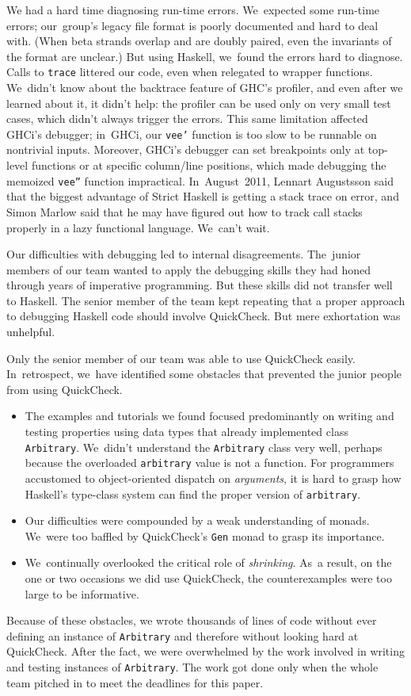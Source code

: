 \documentclass[preprint,nonatbib,blockstyle,times]{sigplanconf}
\newcommand\seclabel[1]{\label{sec:#1}}
\begin{document}
We had a hard time diagnosing run-time errors.
We~expected some run-time errors;
our~group's legacy file
format is poorly documented and hard to deal with.
(When beta
strands overlap and are doubly paired, even the invariants of the
format are unclear.)
But using Haskell, we~found the errors hard to diagnose.
Calls to
\texttt{trace} 
littered our code,
even when relegated to wrapper functions.
We~didn't know about the backtrace feature of GHC's profiler,
and even after we learned about it, it didn't help:
the profiler can be used only on very small test cases,
which didn't always trigger the errors.
This same limitation affected GHCi's debugger; 
in~GHCi, our \texttt{vee'} function
is too slow to be runnable on nontrivial
inputs.
Moreover,  GHCi's debugger can set breakpoints only at top-level functions
or at specific column/line positions, which made debugging the memoized
\texttt{vee''} function impractical.
In~August~2011, 
Lennart Augustsson said that the biggest advantage of Strict
Haskell is getting a stack trace on error,
and Simon Marlow said that he may have figured out how to track call
stacks properly in a lazy functional language.
We~can't wait.

Our difficulties with debugging led to internal disagreements.
The~junior members of our team wanted to apply the debugging
skills they had honed through years of imperative programming.
But these skills did not transfer well to Haskell.
The senior member of the team kept repeating that a proper approach to
debugging Haskell code should involve QuickCheck.
But mere exhortation was unhelpful.

\seclabel{awkward-quickcheck}

Only the senior member of our team was able to use
QuickCheck easily.
In~retrospect, we~have identified some obstacles that prevented the
junior people from using
QuickCheck.
\begin{itemize}
\item
The examples and tutorials we found focused 
predominantly on writing and testing properties using data types that
already implemented class \texttt{Arbitrary}.
We~didn't understand the \texttt{Arbitrary} class very well, 
perhaps because the overloaded \texttt{arbitrary} value is not a
function.
For programmers accustomed to object-oriented dispatch
on \emph{arguments}, it is hard to grasp how Haskell's type-class
system can find the proper version
of \texttt{arbitrary}.
\item
Our difficulties were compounded by a weak understanding of monads.
We~were too baffled by QuickCheck's \texttt{Gen} monad to grasp its
importance.
\item
We~continually overlooked the critical role of \emph{shrinking}.
As~a result, on the one or two occasions we did 
use QuickCheck, the counterexamples were too large to be
informative. 
\end{itemize}
Because of these obstacles, 
we wrote thousands of lines of code without ever defining an instance
of \texttt{Arbitrary} and therefore
without looking hard at QuickCheck.
After the fact, we were overwhelmed by the work
involved in writing and testing instances
of
\texttt{Arbitrary}.
The work got done only when the whole team pitched in to
meet the deadlines for this paper.
\end{document}
